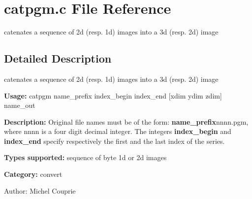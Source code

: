 \section{catpgm.c File Reference}
\label{catpgm_8c}
catenates a sequence of 2d (resp. 1d) images into a 3d (resp. 2d) image  




\label{_details}
\subsection{Detailed Description}
catenates a sequence of 2d (resp. 1d) images into a 3d (resp. 2d) image 

{\bf Usage:} catpgm name\_\-prefix index\_\-begin index\_\-end [xdim ydim zdim] name\_\-out

{\bf Description:} Original file names must be of the form: {\bf name\_\-prefix}nnnn.pgm, where nnnn is a four digit decimal integer. The integers {\bf index\_\-begin} and {\bf index\_\-end} specify respectively the first and the last index of the series.

{\bf Types supported:} sequence of byte 1d or 2d images

{\bf Category:} convert

\begin{Desc}
\item[Author:]Michel Couprie \end{Desc}
